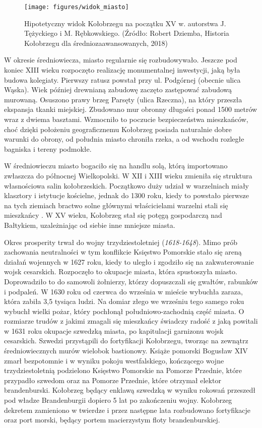 \documentclass{amuthesis}
\begin{document}
\begin{figure}[t]

{\centering \texttt{[image: figures/widok\_miasto]} 

}

\caption{Hipotetyczny widok Kołobrzegu na początku XV w. autorstwa J. Tężyckiego i M. Rębkowskiego. (Źródło: Robert Dziemba, Historia Kołobrzegu dla średniozaawansowanych, 2018)}\label{fig:ryc7}
\end{figure}

W okresie średniowiecza, miasto regularnie się rozbudowywało.
Jeszcze pod koniec XIII wieku rozpoczęto realizację monumentalnej inwestycji, jaką była budowa kolegiaty.
Pierwszy ratusz powstał przy ul. Podgórnej (obecnie ulica Wąska).
Wiek później drewnianą zabudowę zaczęto zastępować zabudową murowaną.
Osuszono prawy brzeg Parsęty (ulica Rzeczna), na który przeszła ekspansja tkanki miejskiej.
Zbudowano mur obronny długości ponad 1500 metrów wraz z dwiema basztami.
Wzmocniło to poczucie bezpieczeństwa mieszkańców, choć dzięki położeniu geograficznemu Kołobrzeg posiada naturalnie dobre warunki do obrony, od południa miasto chroniła rzeka, a od wschodu rozległe bagniska i tereny podmokłe.

W średniowieczu miasto bogaciło się na handlu solą, którą importowano zwłaszcza do północnej Wielkopolski.
W XII i XIII wieku zmieniła się struktura własnościowa salin kołobrzeskich.
Początkowo duży udział w warzelniach miały klasztory i istytucje kościelne, jednak do 1300 roku, kiedy to powstało pierwsze na tych ziemiach bractwo solne głównymi właścicielami warzelni stali się mieszkańcy \autocite{heider}.
W XV wieku, Kołobrzeg stał się potęgą gospodarczą nad Bałtykiem, uzależniając od siebie inne mniejsze miasta.

Okres prosperity trwał do wojny trzydziestoletniej (\emph{1618-1648}).
Mimo prób zachowania neutralności w tym konflikcie Księstwo Pomorskie stało się areną działań wojennych w 1627 roku, kiedy to uległo i zgodziło się na zakwaterowanie wojsk cesarskich.
Rozpoczęło to okupacje miasta, która spustoszyła miasto.
Doprowadziło to do samowoli żołnierzy, którzy dopuszczali się gwałtów, rabunków i podpaleń.
W 1630 roku od czerwca do września w mieście wybuchła zaraza, która zabiła 3,5 tysiąca ludzi.
Na domiar złego we wrześniu tego samego roku wybuchł wielki pożar, który pochłonął południowo-zachodnią część miasta.
O rozmiarze trudów z jakimi zmagali się mieszkańcy świadczy radość z jaką powitali w 1631 roku okupacje szwedzką miasta, po kapitulacji garnizonu wojsk cesarskich.
Szwedzi przystąpili do fortyfikacji Kołobrzegu, tworząc na zewnątrz średniowiecznych
murów wielobok bastionowy.
Książe pomorski Bogusław XIV zmarł bezpotomnie i w wyniku pokoju westfalskiego, kończącego wojne trzydziestoletnią podzielono Księstwo Pomorskie na Pomorze Przednie, które przypadło szwedom oraz na Pomorze Przednie, które otrzymał elektor brandenburski.
Kołobrzeg będący enklawą szwedzką w wyniku rokowań przeszedł pod władze Brandenburgii dopiero 5 lat po zakończeniu wojny.
Kołobrzeg dekretem zamieniono w twierdze i przez następne lata rozbudowano fortyfikacje oraz port morski, będący portem macierzystym floty brandenburskiej.
\end{document}
